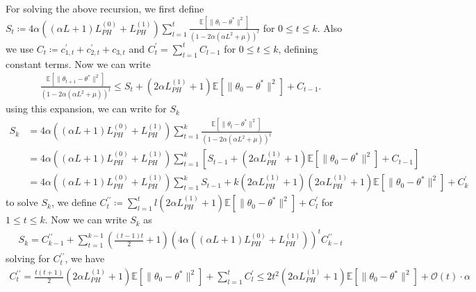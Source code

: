 \documentclass[a4paper]{article}
\newcommand{\norm}[1]{\|#1 \|}
\newcommand{\Exs}{\mathbb{E}}
\newcommand{\thetastar}{\theta^*}
\newcommand{\constLPH}[1]{L_{PH}^{(#1)}}
\newcommand{\stepsize}{\alpha}
\begin{document}
\pagebreak

For solving the above recursion, we first define $S_{t} \coloneq 4\stepsize\left(\left(\stepsize L + 1\right)\constLPH{0} + \constLPH{1}\right)\sum_{l = 1}^{t}\frac{\Exs\left[\norm{\theta_{l} - \thetastar}^{2}\right]}{\left(1 - 2\stepsize\left(\stepsize L^{2} + \mu\right)\right)^{l}}$ for $0 \le t \le k$. Also we use $C_{t} \coloneq c_{1, t}^{\prime} + c_{2, t}^{\prime} + c_{3, t}$ and $C^{\prime}_{t} = \sum_{l = 1}^{t}C_{l - 1}$ for $0 \le t \le k$, defining constant terms. Now we can write
\begin{align*}
	\frac{\Exs\left[\norm{\theta_{t + 1} - \thetastar}^{2}\right]}{\left(1 - 2\stepsize\left(\stepsize L^{2} + \mu\right)\right)^{t}} \le S_{t} + \left(2\stepsize\constLPH{1} + 1\right)\Exs\left[\norm{\theta_{0} - \thetastar}^{2}\right] +‌ C_{t - 1}.‌
\end{align*}
using this expansion, we can write for $S_{k}$
\begin{align*}
	S_{k} & = 4\stepsize\left(\left(\stepsize L + 1\right)\constLPH{0} + \constLPH{1}\right)\sum_{t = 1}^{k}\frac{\Exs\left[\norm{\theta_{t} - \thetastar}^{2}\right]}{\left(1 - 2\stepsize\left(\stepsize L^{2} + \mu\right)\right)^{t}} \\
	& = 4\stepsize\left(\left(\stepsize L + 1\right)\constLPH{0} + \constLPH{1}\right)\sum_{t = 1}^{k}\left[S_{t - 1} + \left(2\stepsize\constLPH{1} + 1\right)\Exs\left[\norm{\theta_{0} - \thetastar}^{2}\right] + C_{t - 1}\right]\\
	& = 4\stepsize\left(\left(\stepsize L + 1\right)\constLPH{0} + \constLPH{1}\right)\sum_{t = 1}^{k}S_{t - 1} + k\left(2\stepsize\constLPH{1} + 1\right)\left(2\stepsize\constLPH{1} + 1\right)\Exs\left[\norm{\theta_{0} - \thetastar}^{2}\right] + C^{\prime}_{k}
\end{align*}
to solve $S_{k}$, we define $C^{\prime\prime}_{t} \coloneq \sum_{l = 1}^{t} l\left(2\stepsize\constLPH{1} + 1\right)\Exs\left[\norm{\theta_{0} - \thetastar}^{2}\right] + C^{\prime}_{l}$ for $1 \le t \le k$. Now we can write $S_{k}$ as
\begin{align*}
	S_{k} = C^{\prime\prime}_{k - 1} + \sum_{t = 1}^{k - 1}\left(\frac{\left(t - 1\right)t}{2} + 1\right)\left(4\stepsize\left(\left(\stepsize L + 1\right)\constLPH{0} + \constLPH{1}\right)\right)^{t}C^{\prime\prime}_{k - t}
\end{align*}
solving for $C^{\prime\prime}_{t}$, we have
\begin{align*}
	C^{\prime\prime}_{t} = \frac{t\left(t + 1\right)}{2}\left(2\stepsize\constLPH{1} + 1\right)\Exs\left[\norm{\theta_{0} - \thetastar}^{2}\right] + \sum_{l = 1}^{t}C^{\prime}_{l} \le 2t^{2}\left(2\stepsize\constLPH{1} + 1\right)\Exs\left[\norm{\theta_{0} - \thetastar}^{2}\right] + \mathcal{O}\left(t\right)\cdot \stepsize
\end{align*}
\end{document}

